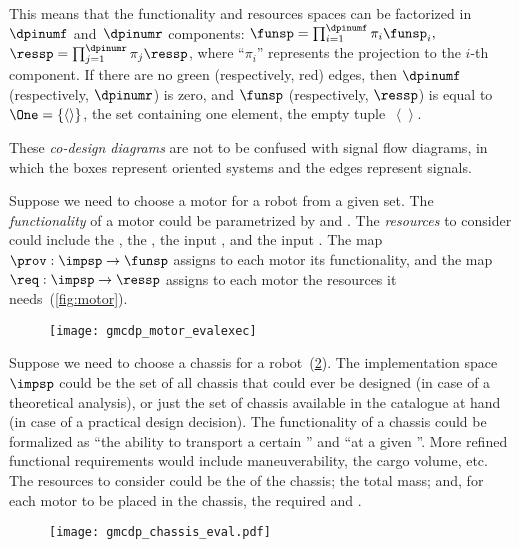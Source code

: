 \noindent This means that the functionality and resources spaces
can be factorized in~$\dpinumf$ and~$\dpinumr$ components: $\funsp=\prod_{i=1}^{\dpinumf}\pi_{i}\funsp_{i},$
$\ressp=\prod_{j=1}^{\dpinumr}\pi_{j}\ressp$, where ``$\pi_{i}$''
represents the projection to the $i$-th component. If there are no
green (respectively, red) edges, then $\dpinumf$ (respectively, $\dpinumr$)
is zero, and $\funsp$ (respectively, $\ressp$) is equal to~$\One=\{\left\langle \right\rangle \}$,
the set containing one element, the empty tuple~$\left\langle \right\rangle $.

These \emph{co-design diagrams} are not to be confused with signal
flow diagrams, in which the boxes represent oriented systems and the
edges represent signals.


\begin{example}
  \label{exa:motor}Suppose we need to choose a motor for a robot from
  a given set. The \emph{functionality} of a motor could be parametrized
  by  and . The \emph{resources} to consider
  could include the , the , the
  input , and the input .
  The map~$\prov:\impsp\rightarrow\funsp$ assigns to each motor its
  functionality, and the map~$\req:\impsp\rightarrow\ressp$ assigns
  to each motor the resources it needs~(\cref{fig:motor}).
\end{example}

\begin{figure}[h]
  \centering
  \texttt{[image: gmcdp\_motor\_evalexec]}
  \caption{\label{fig:motor_evalexec}}
\end{figure}


\begin{example}
  \label{exa:chassis}Suppose we need to choose a chassis for a robot~(\cref{fig:gmcdp_chassis_eval}).
  The implementation space~$\impsp$ could be the set of all chassis
  that could ever be designed (in case of a theoretical analysis), or
  just the set of chassis available in the catalogue at hand (in case
  of a practical design decision). The functionality of a chassis could
  be formalized as ``the ability to transport a certain '' and ``at a given ''. More refined
  functional requirements would include maneuverability, the cargo volume,
  etc. The resources to consider could be the  of
  the chassis; the total mass; and, for each motor to be placed in the
  chassis, the required  and .
\end{example}
\begin{figure}[h]
  \centering
  \texttt{[image: gmcdp\_chassis\_eval.pdf]}
  \caption{\label{fig:gmcdp_chassis_eval}}
\end{figure}

